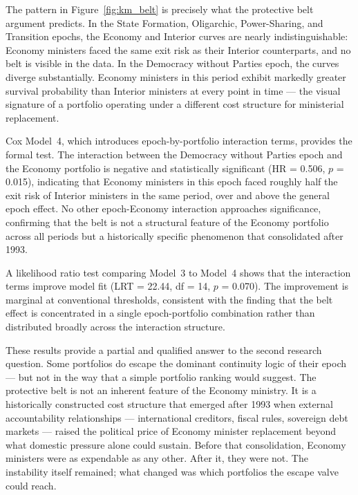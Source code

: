 \documentclass[doc, 12pt, a4paper,floatsintext]{apa7}
\begin{document}
The pattern in Figure~\ref{fig:km_belt} is precisely what the 
protective belt argument predicts. In the State Formation, 
Oligarchic, Power-Sharing, and Transition epochs, the Economy 
and Interior curves are nearly indistinguishable: Economy 
ministers faced the same exit risk as their Interior counterparts, 
and no belt is visible in the data. In the Democracy without 
Parties epoch, the curves diverge substantially. Economy ministers 
in this period exhibit markedly greater survival probability than 
Interior ministers at every point in time --- the visual signature 
of a portfolio operating under a different cost structure for 
ministerial replacement.

Cox Model~4, which introduces epoch-by-portfolio interaction 
terms, provides the formal test. The interaction between the 
Democracy without Parties epoch and the Economy portfolio is 
negative and statistically significant (HR = 0.506, $p$ = 0.015), 
indicating that Economy ministers in this epoch faced roughly half 
the exit risk of Interior ministers in the same period, over and 
above the general epoch effect. No other epoch-Economy interaction 
approaches significance, confirming that the belt is not a 
structural feature of the Economy portfolio across all periods 
but a historically specific phenomenon that consolidated after 
1993.

A likelihood ratio test comparing Model~3 to Model~4 shows that 
the interaction terms improve model fit (LRT = 22.44, df = 14, 
$p$ = 0.070). The improvement is marginal at conventional 
thresholds, consistent with the finding that the belt effect is 
concentrated in a single epoch-portfolio combination rather than 
distributed broadly across the interaction structure.

These results provide a partial and qualified answer to the second 
research question. Some portfolios do escape the dominant 
continuity logic of their epoch --- but not in the way that a 
simple portfolio ranking would suggest. The protective belt is not 
an inherent feature of the Economy ministry. It is a historically 
constructed cost structure that emerged after 1993 when external 
accountability relationships --- international creditors, fiscal 
rules, sovereign debt markets --- raised the political price of 
Economy minister replacement beyond what domestic pressure alone 
could sustain. Before that consolidation, Economy ministers were 
as expendable as any other. After it, they were not. The 
instability itself remained; what changed was which portfolios 
the escape valve could reach.
\end{document}
